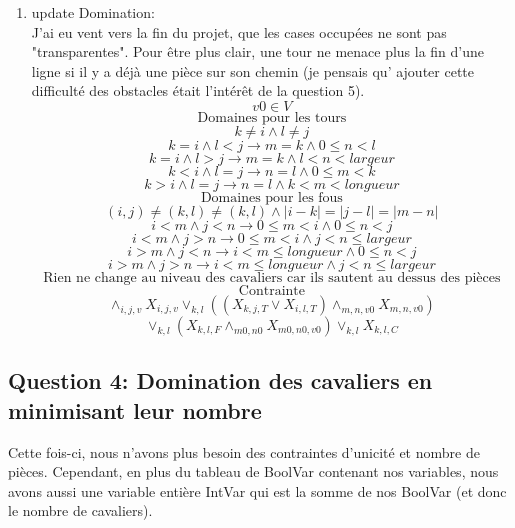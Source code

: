 \begin{enumerate}
    \item update Domination:\\
    J'ai eu vent vers la fin du projet, que les cases occupées ne sont pas "transparentes". Pour être plus clair, une tour ne menace plus la fin d'une ligne si il y a déjà une pièce sur son chemin (je pensais qu' ajouter cette difficulté des obstacles était l'intérêt de la question 5).\\
    \[ v0 \in V \]
    \[ \text{Domaines pour les tours} \]
    \[ k \neq i \land l \neq j\]
    \[ k = i \land l < j \longrightarrow  m=k \land 0 \leq n < l\]
    \[ k = i \land l > j \longrightarrow  m=k \land l < n < largeur  \]
    \[ k < i \land l = j \longrightarrow  n=l \land 0 \leq m < k\]
    \[ k > i \land l = j \longrightarrow  n=l \land k < m < longueur  \]
    \[ \text{Domaines pour les fous} \]
    \[ (i,j) \neq (k,l) \neq (k,l) \land |i-k| = |j-l| = |m-n| \]
    \[ i < m \land j < n \longrightarrow 0 \leq m < i \land 0 \leq n < j\]
    \[ i < m \land j > n \longrightarrow 0 \leq m < i \land j < n \leq largeur\]
    \[ i > m \land j < n \longrightarrow i < m \leq longueur \land 0 \leq n < j\]
    \[ i > m \land j > n \longrightarrow i < m \leq longueur \land j < n \leq largeur\]
    \[ \text{Rien ne change au niveau des cavaliers car ils sautent au dessus des pièces} \]
    \[ \text{Contrainte} \]
    \[  \land_{i,j,v} X_{i,j,v} \lor_{k,l} ( ( X_{k,j,T} \lor X_{i,l,T} ) \land_{m,n,v0} X_{m,n,v0} ) \] 
    \[ \lor_{k,l} ( X_{k,l,F} \land_{m0,n0} X_{m0,n0,v0} ) \lor_{k,l} X_{k,l,C} \]
\end{enumerate}



\subsection{Question 4: Domination des cavaliers en minimisant leur nombre}
Cette fois-ci, nous n'avons plus besoin des contraintes d'unicité et nombre de pièces. Cependant, en plus du tableau de BoolVar contenant nos variables, nous avons aussi une variable entière IntVar qui est la somme de nos BoolVar (et donc le nombre de cavaliers).

